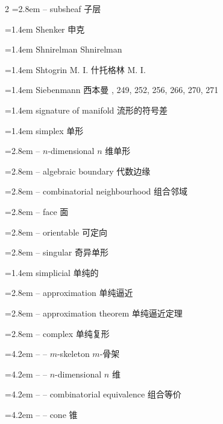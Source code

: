 \begin{multicols}{2}
\noindent\hangindent=2.8em -- subsheaf \quad 子层 \par
\noindent\hangindent=1.4em Shenker \quad 申克 \par
\noindent\hangindent=1.4em Shnirelman \quad Shnirelman \par
\noindent\hangindent=1.4em Shtogrin M. I. \quad 什托格林 M. I. \par
\noindent\hangindent=1.4em Siebenmann \quad 西本曼 , 249, 252, 256, 266, 270, 271\par
\noindent\hangindent=1.4em signature of manifold \quad 流形的符号差 \par
\noindent\hangindent=1.4em simplex \quad 单形 \quad\par
\noindent\hangindent=2.8em -- $n$-dimensional \quad $n$ 维单形 \par
\noindent\hangindent=2.8em -- algebraic boundary \quad 代数边缘 \par
\noindent\hangindent=2.8em -- combinatorial neighbourhood \quad 组合邻域 \par
\noindent\hangindent=2.8em -- face \quad 面 \par
\noindent\hangindent=2.8em -- orientable \quad 可定向 \par
\noindent\hangindent=2.8em -- singular \quad 奇异单形 \par
\noindent\hangindent=1.4em simplicial \quad 单纯的 \quad\par
\noindent\hangindent=2.8em -- approximation \quad 单纯逼近 \par
\noindent\hangindent=2.8em -- approximation theorem \quad 单纯逼近定理 \par
\noindent\hangindent=2.8em -- complex \quad 单纯复形 \par
\noindent\hangindent=4.2em -- -- $m$-skeleton \quad $m$-骨架 \par
\noindent\hangindent=4.2em -- -- $n$-dimensional \quad $n$ 维 \par
\noindent\hangindent=4.2em -- -- combinatorial equivalence \quad 组合等价 \par
\noindent\hangindent=4.2em -- -- cone \quad 锥 \par

\end{multicols}
